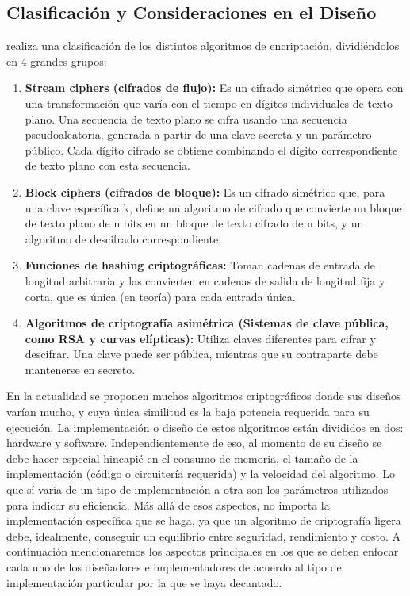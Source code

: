 \documentclass[a4paper,10pt]{article}
\begin{document}
	\subsection{Clasificación y Consideraciones en el Diseño}
	\textcite{wehbe2022criptografia} realiza una clasificación de los distintos algoritmos de encriptación, dividiéndolos en 4 grandes grupos:
	\begin{enumerate}
		\item \textbf{Stream ciphers (cifrados de flujo): }Es un cifrado simétrico que opera con una transformación que varía con el tiempo en dígitos individuales de texto plano. Una secuencia de texto plano se cifra usando una secuencia pseudoaleatoria, generada a partir de una clave secreta y un parámetro público. Cada dígito cifrado se obtiene combinando el dígito correspondiente de texto plano con esta secuencia.
		\item \textbf{Block ciphers (cifrados de bloque):} Es un cifrado simétrico que, para una clave específica k, define un algoritmo de cifrado que convierte un bloque de texto plano de n bits en un bloque de texto cifrado de n bits, y un algoritmo de descifrado correspondiente.
		\item \textbf{Funciones de hashing criptográficas: }Toman cadenas de entrada de longitud arbitraria y las convierten en cadenas de salida de longitud fija y corta, que es única (en teoría) para cada entrada única.
		\item \textbf{Algoritmos de criptografía asimétrica (Sistemas de clave pública, como RSA y curvas elípticas): }Utiliza claves diferentes para cifrar y descifrar. Una clave puede ser pública, mientras que su contraparte debe mantenerse en secreto.
	\end{enumerate}
	En la actualidad se proponen muchos algoritmos criptográficos donde sus diseños varían mucho, y cuya única similitud es la baja potencia requerida para su ejecución. La implementación o diseño de estos algoritmos están divididos en dos: hardware y software. Independientemente de eso, al momento de su diseño se debe hacer especial hincapié en el consumo de memoria, el tamaño de la implementación (código o circuitería requerida) y la velocidad del algoritmo. Lo que sí varía de un tipo de implementación a otra son los parámetros utilizados para indicar su eficiencia. Más allá de esos aspectos, no importa la implementación específica que se haga, ya que un algoritmo de criptografía ligera debe, idealmente, conseguir un equilibrio entre seguridad, rendimiento y costo.
	A continuación mencionaremos los aspectos principales en los que se deben enfocar cada uno de los diseñadores e implementadores de acuerdo al tipo de implementación particular por la que se haya decantado.
\end{document}
